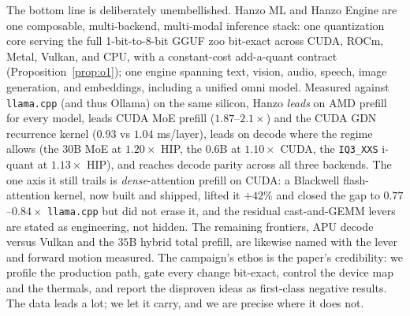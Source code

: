 \documentclass[11pt]{article}
\begin{document}
The bottom line is deliberately unembellished. Hanzo ML and Hanzo Engine are one composable,
multi-backend, multi-modal inference stack: one quantization core serving the full 1-bit-to-8-bit
GGUF zoo bit-exact across CUDA, ROCm, Metal, Vulkan, and CPU, with a constant-cost add-a-quant
contract (Proposition~\ref{prop:o1}); one engine spanning text, vision, audio, speech, image
generation, and embeddings, including a unified omni model. Measured against \texttt{llama.cpp} (and
thus Ollama) on the same silicon, Hanzo \emph{leads} on AMD prefill for every model, leads CUDA MoE
prefill ($1.87$--$2.1\times$) and the CUDA GDN recurrence kernel ($0.93$ vs $1.04$ ms/layer), leads on
decode where the regime allows (the $30$B MoE at $1.20\times$ HIP, the $0.6$B at $1.10\times$ CUDA, the
\texttt{IQ3\_XXS} i-quant at $1.13\times$ HIP), and reaches decode parity across all three backends. The
one axis it still trails is \emph{dense}-attention prefill on CUDA: a Blackwell flash-attention kernel,
now built and shipped, lifted it $+42\%$ and closed the gap to $0.77$--$0.84\times$ \texttt{llama.cpp}
but did not erase it, and the residual cast-and-GEMM levers are stated as engineering, not hidden. The
remaining frontiers, APU decode versus Vulkan and the $35$B hybrid total prefill, are likewise named
with the lever and forward motion measured. The campaign's
ethos is the paper's credibility: we profile the production path, gate every change bit-exact,
control the device map and the thermals, and report the disproven ideas as first-class negative
results. The data leads a lot; we let it carry, and we are precise where it does not.
\end{document}
